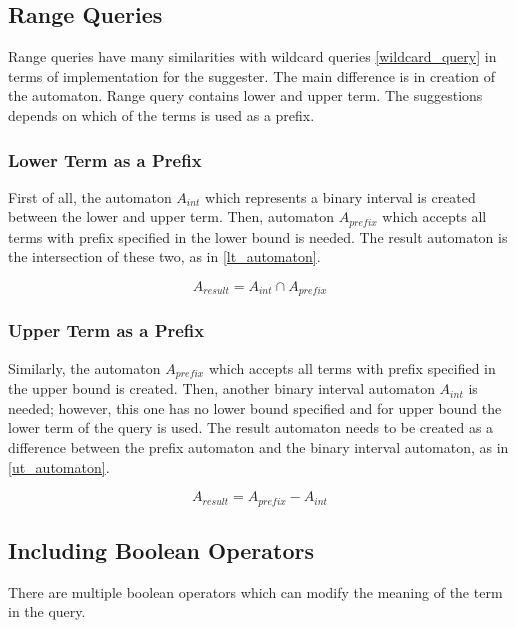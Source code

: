 \subsection{Range Queries}
Range queries have many similarities with wildcard queries \ref{wildcard_query} in terms of implementation for the
suggester. The main difference is in creation of the automaton. Range query contains lower and upper term. The
suggestions depends on which of the terms is used as a prefix.

\subsubsection{Lower Term as a Prefix}
First of all, the automaton $A_{int}$ which represents a binary interval is created between the lower and upper term. Then,
automaton $A_{prefix}$ which accepts all terms with prefix specified in the lower bound is needed. The result automaton is the
intersection of these two, as in \ref{lt_automaton}.

\begin{equation}
\label{lt_automaton}
A_{result} = A_{int} \cap A_{prefix}
\end{equation}

\subsubsection{Upper Term as a Prefix}
Similarly, the automaton $A_{prefix}$ which accepts all terms with prefix specified in the upper bound is created. Then,
another binary interval automaton $A_{int}$ is needed; however, this one has no lower bound specified and for upper bound the
lower term of the query is used. The result automaton needs to be created as a difference between the prefix automaton
and the binary interval automaton, as in \ref{ut_automaton}.

\begin{equation}
\label{ut_automaton}
A_{result} = A_{prefix} - A_{int}
\end{equation}

\subsection{Including Boolean Operators}
\label{boolean_ops}


There are multiple boolean operators which can modify the meaning of the term in the query.

